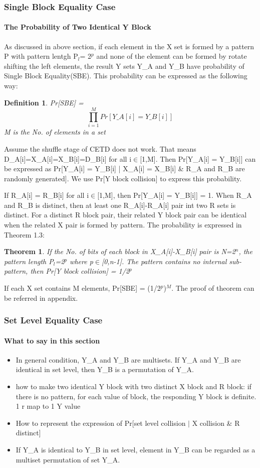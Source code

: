 \documentclass{article}
\newtheorem{theorem}{Theorem}[section]
\newtheorem{defination}{Definition}[section]
\begin{document}
\subsubsection{Single Block Equality Case}
\paragraph{The Probability of Two Identical Y Block}
As discussed in above section, if each element in the X set is formed by a pattern P with pattern lentgh P$_l$= 2$^p$ and none of the element can be formed by rotate shifting the left elements, the result Y sets Y\_A and Y\_B have probability of Single Block Equality(SBE). This probability can be expressed as the following way:
\begin{defination}
Pr[SBE] = $$\prod_{i=1}^M Pr[Y\_A[i] = Y\_B[i]]$$ M is the No. of elements in a set
\end{defination} 
Assume the shuffle stage of CETD does not work. That means D\_A[i]=X\_A[i]=X\_B[i]=D\_B[i] for all i$\in$[1,M]. Then Pr[Y\_A[i] = Y\_B[i]] can be expressed as Pr[Y\_A[i] = Y\_B[i] | X\_A[i] = X\_B[i] \& R\_A and R\_B are randomly generated]. We use Pr[Y block collision] to express this probability. 

If R\_A[i] = R\_B[i] for all i$\in$[1,M], then Pr[Y\_A[i] = Y\_B[i]] = 1. When R\_A and R\_B is distinct, then at least one R\_A[i]-R\_A[i] pair int two R sets is distinct. For a distinct R block pair, their related Y block pair can be identical when the related X pair is formed by pattern. The probability is expressed in Theorem 1.3:
\begin{theorem}
If the No. of bits of each block in X\_A[i]-X\_B[i] pair is N=2$^n$, the pattern length P$_l$=2$^p$ where p$\in$[0,n-1]. The pattern contains no internal sub-pattern, then Pr[Y block collision] = 1/2$^p$
\end{theorem}
If each X set contains M elements, Pr[SBE] = (1/2$^p$)$^M$.
The proof of theorem can be referred in appendix.

\subsubsection{Set Level Equality Case}
\paragraph{What to say in this section}
\begin{itemize}
	\item In general condition, Y\_A and Y\_B are multisets. If Y\_A and Y\_B are identical in set level, then Y\_B is a permutation of Y\_A.
	\item how to make two identical Y block with two distinct X block and R block: if there is no pattern, for each value of block, the responding Y block is definite. 1 r map to 1 Y value
	\item How to represent the expression of Pr[set level collision $\mid$ X collision \& R distinct]
	\item If Y\_A is identical to Y\_B in set level, element in Y\_B can be regarded as a multiset permutation of set Y\_A.
\end{itemize}
\end{document}
